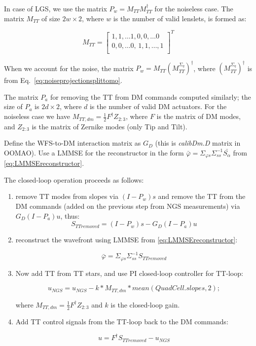 \documentclass[a4paper,12pt]{article}
\begin{document}
In case of LGS, we use the matrix $P_w = M_{TT} M_{TT}^\dagger$ for the noiseless case. The matrix  $M_{TT}$ of size $2w\times 2$, where $w$ is the number of valid lenslets, is formed as: 

\begin{equation}
 M_{TT} = \left[   \begin{array}{cc}  
1,1,\dots 1, 0, 0, \dots 0 \\
0, 0, \dots 0, \,1,1,\dots, 1 \\
                   \end{array} \right]^T
\end{equation} 

When we account for the noise, the matrix $P_w = M_{TT} (M_{TT}^{\Sigma_\eta})^\dagger$, where $ (M_{TT}^{\Sigma_\eta})^\dagger$ is from  Eq.~\ref{eq:noiseprojectionsplittomo}.

The matrix $P_a$ for removing the TT from DM commands computed similarly; the size of $P_a$ is $2d\times 2$, where $d$ is the number of valid DM actuators. For the noiseless case we have $M_{TT,dm} = \frac{1}{2} F^\dagger Z_{2:3}$, where $F$ is the matrix of DM modes, and $Z_{2:3}$ is the matrix of Zernike modes (only Tip and Tilt).

Define the WFS-to-DM interaction matrix as $G_{D}$ (this is \textit{calibDm.D} matrix in OOMAO). Use a LMMSE for the reconstructor in the form $\bar{\varphi} = \Sigma_{\varphi s}  \Sigma_{s s}^{-1} \bar{S_\alpha}$ from \eqref{eq:LMMSEreconstructor}.


The closed-loop operation proceeds as follows:
\begin{enumerate}
 \item remove TT modes from slopes via $(I - P_w)s$ and remove the TT from the DM commands (added on the previous step from NGS measurements) via $G_D(I - P_a)u$, thus:
$$S_{TTremoved} = (I - P_w)s  - G_D (I - P_a) u$$

\item reconstruct the wavefront using LMMSE from \eqref{eq:LMMSEreconstructor}:

$$\bar{\varphi} = \Sigma_{\varphi s}  \Sigma_{s s}^{-1} S_{TTremoved} $$

\item Now add TT from TT stars, and use PI closed-loop controller for TT-loop:

$$ u_{NGS} = u_{NGS} - k* M_{TT,dm}*mean(QuadCell.slopes,2) ; $$

where $M_{TT,dm} = \frac{1}{2} F^\dagger Z_{2:3}$ and $k$ is the closed-loop gain.

\item Add TT control signals from the TT-loop back to the DM commands:

$$u = F^\dagger S_{TTremoved} -  u_{NGS}$$
\end{enumerate}











\end{document}
